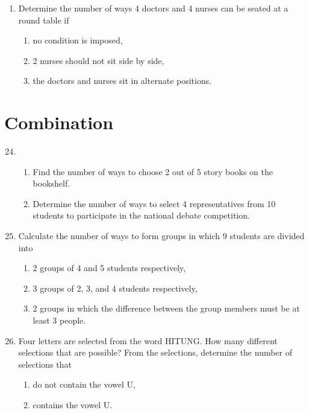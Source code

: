 \documentclass{report}
\begin{document}
\begin{multicols*}{2}
\begin{enumerate}
            \item Determine the number of ways 4 doctors and 4 nurses can be seated at a round
                  table if
                  \begin{enumerate}
                        \item no condition is imposed,
                        \item 2 nurses should not sit side by side,
                        \item the doctors and nurses sit in alternate positions.
                  \end{enumerate}

      \end{enumerate}
      \section{Combination}
      \begin{enumerate}
            \setcounter{enumi}{23}
            \item \begin{enumerate}
                        \item Find the number of ways to choose 2 out of 5 story books on the bookshelf.
                        \item Determine the number of ways to select 4 representatives from 10 students to
                              participate in the national debate competition.
                  \end{enumerate}

            \item Calculate the number of ways to form groups in which 9 students are divided
                  into
                  \begin{enumerate}
                        \item 2 groups of 4 and 5 students respectively,
                        \item 3 groups of 2, 3, and 4 students respectively,
                        \item 2 groups in which the difference between the group members must be at least 3 people.
                  \end{enumerate}

            \item Four letters are selected from the word HITUNG. How many different selections
                  that are possible? From the selections, determine the number of selections that
                  \begin{enumerate}
                        \item do not contain the vowel U,
                        \item contains the vowel U.
                  \end{enumerate}


\end{enumerate}
\end{multicols*}
\end{document}
